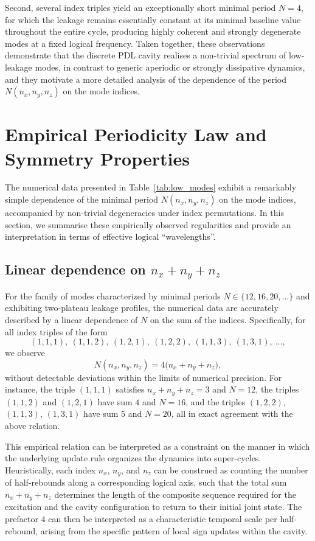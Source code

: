 \documentclass{article}
\theoremstyle{definition}
\begin{document}
Second, several index triples yield an exceptionally short minimal period $N = 4$, for which the leakage remains essentially constant at its minimal baseline value throughout the entire cycle, producing highly coherent and strongly degenerate modes at a fixed logical frequency.\cite{Effective_Fields_PDL_2026} Taken together, these observations demonstrate that the discrete PDL cavity realises a non-trivial spectrum of low-leakage modes, in contrast to generic aperiodic or strongly dissipative dynamics, and they motivate a more detailed analysis of the dependence of the period $N(n_x,n_y,n_z)$ on the mode indices.

\section{Empirical Periodicity Law and Symmetry Properties}

The numerical data presented in Table~\ref{tab:low_modes} exhibit a remarkably simple dependence of the minimal period $N(n_x,n_y,n_z)$ on the mode indices, accompanied by non-trivial degeneracies under index permutations. In this section, we summarise these empirically observed regularities and provide an interpretation in terms of effective logical ``wavelengths''.

\subsection{Linear dependence on \texorpdfstring{$n_x+n_y+n_z$}{n\_x+n\_y+n\_z}}

For the family of modes characterized by minimal periods $N \in \{12,16,20,\dots\}$ and exhibiting two-plateau leakage profiles, the numerical data are accurately described by a linear dependence of $N$ on the sum of the indices.\cite{Effective_Fields_PDL_2026} Specifically, for all index triples of the form
\[
(1,1,1),\ (1,1,2),\ (1,2,1),\ (1,2,2),\ (1,1,3),\ (1,3,1),\ \dots,
\]
we observe
\[
N(n_x,n_y,n_z) = 4 \bigl(n_x + n_y + n_z\bigr),
\]
without detectable deviations within the limits of numerical precision.\cite{Effective_Fields_PDL_2026} For instance, the triple $(1,1,1)$ satisfies $n_x+n_y+n_z = 3$ and $N = 12$, the triples $(1,1,2)$ and $(1,2,1)$ have sum $4$ and $N = 16$, and the triples $(1,2,2)$, $(1,1,3)$, $(1,3,1)$ have sum $5$ and $N = 20$, all in exact agreement with the above relation.

This empirical relation can be interpreted as a constraint on the manner in which the underlying update rule organizes the dynamics into super-cycles. Heuristically, each index $n_x$, $n_y$, and $n_z$ can be construed as counting the number of half-rebounds along a corresponding logical axis, such that the total sum $n_x+n_y+n_z$ determines the length of the composite sequence required for the excitation and the cavity configuration to return to their initial joint state.\cite{Effective_Fields_PDL_2026} The prefactor $4$ can then be interpreted as a characteristic temporal scale per half-rebound, arising from the specific pattern of local sign updates within the cavity.
\end{document}
